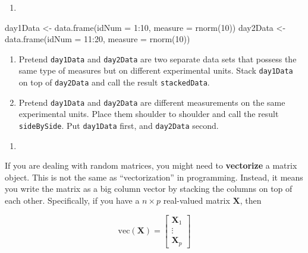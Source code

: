 \documentclass[
  12pt,
  krantz2]{krantz}
\makeatletter
\newenvironment{Shaded}{\begin{snugshade}}{\end{snugshade}}
\newcommand{\AttributeTok}[1]{\textcolor[rgb]{0.61,0.61,0.61}{#1}}
\newcommand{\DecValTok}[1]{\textcolor[rgb]{0.06,0.06,0.06}{#1}}
\newcommand{\FunctionTok}[1]{\textcolor[rgb]{0,0,0}{#1}}
\newcommand{\NormalTok}[1]{#1}
\newcommand{\OtherTok}[1]{\textcolor[rgb]{0.37,0.37,0.37}{#1}}
\newcommand{\SpecialCharTok}[1]{\textcolor[rgb]{0,0,0}{#1}}
\providecommand{\tightlist}{%
  \setlength{\itemsep}{0pt}\setlength{\parskip}{0pt}}
\newenvironment{kframe}{%
\medskip{}
\setlength{\fboxsep}{.8em}
 \def\at@end@of@kframe{}%
 \ifinner\ifhmode%
  \def\at@end@of@kframe{\end{minipage}}%
  \begin{minipage}{\columnwidth}%
 \fi\fi%
 \def\FrameCommand##1{\hskip\@totalleftmargin \hskip-\fboxsep
 \colorbox{shadecolor}{##1}\hskip-\fboxsep
     \hskip-\linewidth \hskip-\@totalleftmargin \hskip\columnwidth}%
 \MakeFramed {\advance\hsize-\width
   \@totalleftmargin\z@ \linewidth\hsize
   \@setminipage}}%
 {\par\unskip\endMakeFramed%
 \at@end@of@kframe}
\renewenvironment{Shaded}{\begin{kframe}}{\end{kframe}}
\makeatother
\begin{document}
\begin{enumerate}
\def\labelenumi{\arabic{enumi}.}
\setcounter{enumi}{1}
\tightlist
\item
\end{enumerate}

\begin{Shaded}
\begin{Highlighting}[]
\NormalTok{day1Data }\OtherTok{\textless{}{-}} \FunctionTok{data.frame}\NormalTok{(}\AttributeTok{idNum =} \DecValTok{1}\SpecialCharTok{:}\DecValTok{10}\NormalTok{, }
                       \AttributeTok{measure =} \FunctionTok{rnorm}\NormalTok{(}\DecValTok{10}\NormalTok{))}
\NormalTok{day2Data }\OtherTok{\textless{}{-}} \FunctionTok{data.frame}\NormalTok{(}\AttributeTok{idNum =} \DecValTok{11}\SpecialCharTok{:}\DecValTok{20}\NormalTok{, }
                       \AttributeTok{measure =} \FunctionTok{rnorm}\NormalTok{(}\DecValTok{10}\NormalTok{))}
\end{Highlighting}
\end{Shaded}

\begin{enumerate}
\def\labelenumi{\alph{enumi})}
\tightlist
\item
  Pretend \texttt{day1Data} and \texttt{day2Data} are two separate data sets that possess the same type of measures but on different experimental units. Stack \texttt{day1Data} on top of \texttt{day2Data} and call the result \texttt{stackedData}.
\item
  Pretend \texttt{day1Data} and \texttt{day2Data} are different measurements on the same experimental units. Place them shoulder to shoulder and call the result \texttt{sideBySide}. Put \texttt{day1Data} first, and \texttt{day2Data} second.
\end{enumerate}

\begin{enumerate}
\def\labelenumi{\arabic{enumi}.}
\setcounter{enumi}{2}
\tightlist
\item
\end{enumerate}

If you are dealing with random matrices, you might need to \textbf{vectorize} a matrix object. This is not the same as ``vectorization'' in programming. Instead, it means you write the matrix as a big column vector by stacking the columns on top of each other. Specifically, if you have a \(n \times p\) real-valued matrix \(\mathbf{X}\), then

\begin{equation} 
\text{vec}(\mathbf{X}) =\begin{bmatrix} \mathbf{X}_1 \\ \vdots \\ \mathbf{X}_p \end{bmatrix} 
\end{equation}
\end{document}
